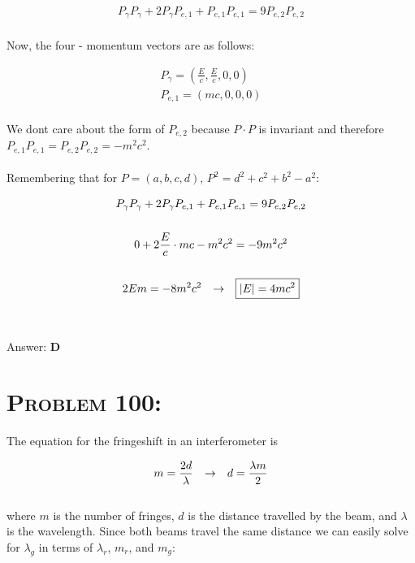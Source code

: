 \documentclass{article}
\begin{document}
\begin{gather}
P_{\gamma}P_{\gamma} + 2 P_{\gamma}P_{e,1} + P_{e,1} P_{e,1}  = 9P_{e,2}P_{e,2}\nonumber
\end{gather}
\\
Now, the four - momentum vectors are as follows:

\begin{gather}
P_{\gamma} = \left( \frac{E}{c}, \frac{E}{c}, 0 , 0    \right)\nonumber\\
P_{e,1} = \left( mc, 0, 0 , 0    \right)\nonumber
\end{gather}
\\
We dont care about the form of $P_{e,2}$ because $P \cdot P$ is invariant and therefore $P_{e,1}P_{e,1} = P_{e,2}P_{e,2} = -m^{2}c^{2}$. \\
\\
Remembering that for $P = (a,b,c,d)$, $P^{2} = d^{2}+c^{2}+b^{2}-a^{2}$:

\begin{gather}
P_{\gamma}P_{\gamma} + 2 P_{\gamma}P_{e,1} + P_{e,1} P_{e,1}  = 9P_{e,2}P_{e,2}\nonumber\\
\nonumber\\
0 + 2 \frac{E}{c} \cdot mc - m^{2}c^{2} = -9 m^{2}c^{2} \nonumber\\
\nonumber\\
2Em = - 8m^{2}c^{2} \hspace{.1in} \rightarrow \hspace{.1in} \boxed{|E| = 4mc^{2}}\nonumber
\end{gather}
\\\\
Answer: \textbf{\textcolor{ProcessBlue}D}\\


\section{\textsc{Problem 100:}} The equation for the fringeshift in an interferometer is

\begin{gather}
m = \frac{2d}{\lambda} \hspace{.1in} \rightarrow \hspace{.1in} d = \frac{\lambda m}{2}
\end{gather}
\\
where $m$ is the number of fringes, $d$ is the distance travelled by the beam, and $\lambda$ is the wavelength. Since both beams travel the same distance we can easily solve for $\lambda_{g}$ in terms of $\lambda_{r}$, $m_{r}$, and $m_{g}$:
\end{document}
